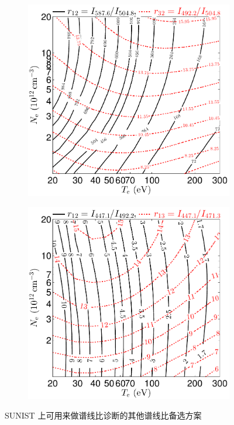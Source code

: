 \begin{figure}[H]
  \centering
  \begin{subfigure}{0.45\textwidth}
    \includegraphics[width=\textwidth]{1-4to5-7to5-getTeNe-lineratio.pdf}
    \caption{}
    \label{fig:chap03:lineratio-backup:1}
  \end{subfigure}
  \hspace{0.05\textwidth}
  \begin{subfigure}{0.45\textwidth}
    \includegraphics[width=\textwidth]{1-9to8-9to7-getTeNe-lineratio.pdf}
    \caption{}
    \label{fig:chap03:lineratio-backup:2}
  \end{subfigure}
  \caption{SUNIST 上可用来做谱线比诊断的其他谱线比备选方案}
  \label{fig:chap03:lineratio-backup}
\end{figure}


